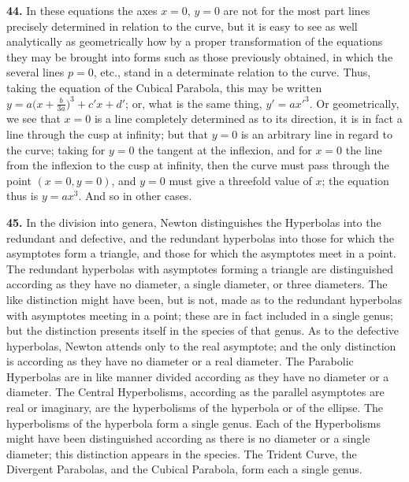 \documentclass[11pt,a4paper]{article}
\begin{document}
\medskip

\textbf{44.} In these equations the axes $x=0$, $y=0$ are not for the most part lines precisely determined in relation to the curve, but it is easy to see as well analytically as geometrically how by a proper transformation of the equations they may be brought into forms such as those previously obtained, in which the several lines $p=0$, etc., stand in a determinate relation to the curve. Thus, taking the equation of the Cubical Parabola, this may be written $y = a\bigl(x+\tfrac{b}{3a}\bigr)^{3} + c'x + d'$; or, what is the same thing, $y' = ax'^{3}$. Or geometrically, we see that $x=0$ is a line completely determined as to its direction, it is in fact a line through the cusp at infinity; but that $y=0$ is an arbitrary line in regard to the curve; taking for $y=0$ the tangent at the inflexion, and for $x=0$ the line from the inflexion to the cusp at infinity, then the curve must pass through the point $(x=0,y=0)$, and $y=0$ must give a threefold value of $x$; the equation thus is $y = ax^{3}$. And so in other cases.

\medskip

\textbf{45.} In the division into genera, Newton distinguishes the Hyperbolas into the redundant and defective, and the redundant hyperbolas into those for which the asymptotes form a triangle, and those for which the asymptotes meet in a point. The redundant hyperbolas with asymptotes forming a triangle are distinguished according as they have no diameter, a single diameter, or three diameters. The like distinction might have been, but is not, made as to the redundant hyperbolas with asymptotes meeting in a point; these are in fact included in a single genus; but the distinction presents itself in the species of that genus. As to the defective hyperbolas, Newton attends only to the real asymptote; and the only distinction is according as they have no diameter or a real diameter. The Parabolic Hyperbolas are in like manner divided according as they have no diameter or a diameter. The Central Hyperbolisms, according as the parallel asymptotes are real or imaginary, are the hyperbolisms of the hyperbola or of the ellipse. The hyperbolisms of the hyperbola form a single genus. Each of the Hyperbolisms might have been distinguished according as there is no diameter or a single diameter; this distinction appears in the species. The Trident Curve, the Divergent Parabolas, and the Cubical Parabola, form each a single genus.

\medskip
\end{document}
